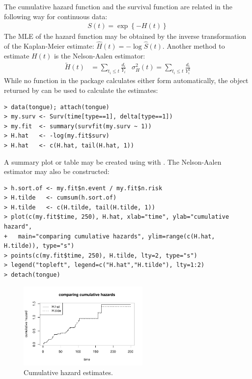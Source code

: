 \documentclass[11pt]{article}
\begin{document}
\pagebreak

{}
\label{cumulativeHazard}

The cumulative hazard function and the survival function are related in the following way for continuous data:
\begin{align*}
S(t) = \exp\left\{-H(t)\right\}
\end{align*}
The MLE of the hazard function may be obtained by the inverse transformation of the Kaplan-Meier estimate: $\hat{H}(t) = -\log\hat{S}(t)$. Another method to estimate $H(t)$ is the Nelson-Aalen estimator:
\begin{align*}
\tilde{H}(t) &= \sum_{t_i \leq t} \frac{d_i}{Y_i}
		&\sigma_H^2(t) = \sum_{t_i\leq t}\frac{d_i}{Y_i^2}
\end{align*}
While no function in the  package calculates either form automatically, the object returned by  can be used to calculate the estimates:
{\color{verbatimrcom}\begin{verbatim}
> data(tongue); attach(tongue)
> my.surv <- Surv(time[type==1], delta[type==1])
> my.fit  <- summary(survfit(my.surv ~ 1))
> H.hat   <- -log(my.fit$surv)
> H.hat   <- c(H.hat, tail(H.hat, 1))
\end{verbatim}}
A summary plot or table may be created using  with . The Nelson-Aalen estimator may also be constructed:
{\color{verbatimrcom}\begin{verbatim}
> h.sort.of <- my.fit$n.event / my.fit$n.risk
> H.tilde   <- cumsum(h.sort.of)
> H.tilde   <- c(H.tilde, tail(H.tilde, 1))
> plot(c(my.fit$time, 250), H.hat, xlab="time", ylab="cumulative hazard",
+   main="comparing cumulative hazards", ylim=range(c(H.hat, H.tilde)), type="s")
> points(c(my.fit$time, 250), H.tilde, lty=2, type="s")
> legend("topleft", legend=c("H.hat","H.tilde"), lty=1:2)
> detach(tongue)
\end{verbatim}}
\begin{figure}[htp]
\centering
\includegraphics[width=0.57\textwidth]{../figures/cumHazard} \vspace{-4mm}
\caption{Cumulative hazard estimates.}
\end{figure}
\end{document}
